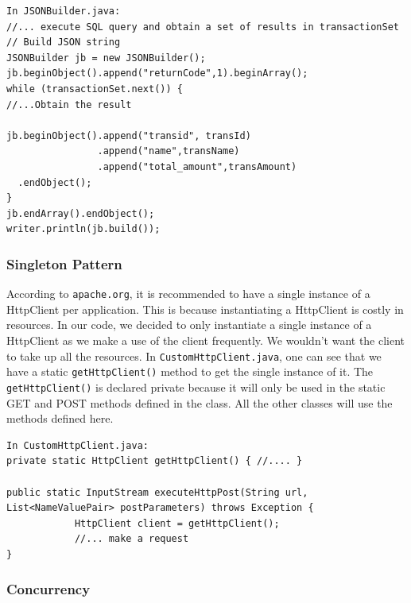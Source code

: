 \documentclass[a4paper,11pt]{article}
\begin{document}
\begin{verbatim}
In JSONBuilder.java:
//... execute SQL query and obtain a set of results in transactionSet
// Build JSON string
JSONBuilder jb = new JSONBuilder();
jb.beginObject().append("returnCode",1).beginArray();
while (transactionSet.next()) {
//...Obtain the result
						
jb.beginObject().append("transid", transId)
                .append("name",transName)
                .append("total_amount",transAmount)
  .endObject();
}
jb.endArray().endObject();			
writer.println(jb.build());
\end{verbatim}

\subsubsection*{Singleton Pattern}

According to \texttt{apache.org}, it is recommended to have a single instance of a HttpClient per application. This is because instantiating a HttpClient is costly in resources. In our code, we decided to only instantiate a single instance of a HttpClient as we make a use of the client frequently. We wouldn't want the client to take up all the resources. In \texttt{CustomHttpClient.java}, one can see that we have a static \texttt{getHttpClient()} method to get the single instance of it. The \texttt{getHttpClient()} is declared private because it will only be used in the static GET and POST methods defined in the class. All the other classes will use the methods defined here. 

\begin{verbatim}
In CustomHttpClient.java:
private static HttpClient getHttpClient() { //.... }

public static InputStream executeHttpPost(String url, 
List<NameValuePair> postParameters) throws Exception {
            HttpClient client = getHttpClient();
            //... make a request
}  
\end{verbatim} 

\subsubsection*{Concurrency}
\end{document}
